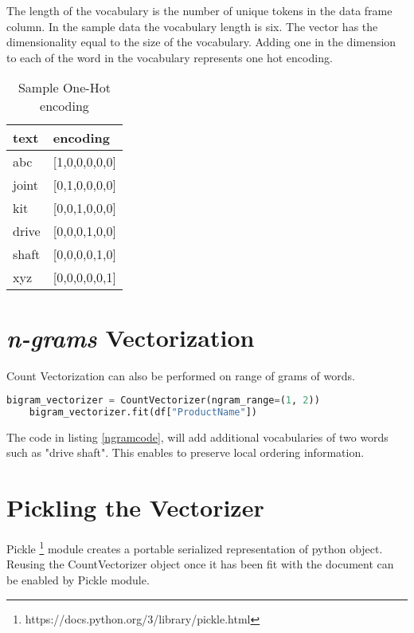 The length of the vocabulary is the number of unique tokens in the data frame column. In the sample data the vocabulary length is six. The vector has the dimensionality equal to the size of the vocabulary. Adding one in the dimension to each of the word in the vocabulary represents one hot encoding.

\begin{table}[]
    \centering
    \caption{Sample One-Hot encoding}
    \label{table:countencode}
    \begin{tabular}{ ll }
          \toprule
          
          \textbf{text}& \textbf{encoding}\\
          \midrule
          abc&[1,0,0,0,0,0]\\
          joint&[0,1,0,0,0,0]\\
          kit&[0,0,1,0,0,0]\\
          drive&[0,0,0,1,0,0]\\
          shaft&[0,0,0,0,1,0]\\
          xyz&[0,0,0,0,0,1]\\
       
          \bottomrule
          \end{tabular}
\end{table}

\section{ \textit{n-grams} Vectorization} \label{sec:ngram_vector}

Count Vectorization can also be performed on range of grams of words. 

\begin{lstlisting}[language=Python,label=ngramcode, caption={\textit{n-gram} vectorization}]
    bigram_vectorizer = CountVectorizer(ngram_range=(1, 2))
    bigram_vectorizer.fit(df["ProductName"])
\end{lstlisting}


The code in listing \ref{ngramcode}, will add additional vocabularies of two words such as "drive shaft". This enables to preserve local ordering information. 

\section{Pickling the Vectorizer} \label{pickle_vector}

Pickle \footnote{https://docs.python.org/3/library/pickle.html} module creates a portable serialized representation of python object. Reusing the CountVectorizer object once it has been fit with the document can be enabled by Pickle module. 

